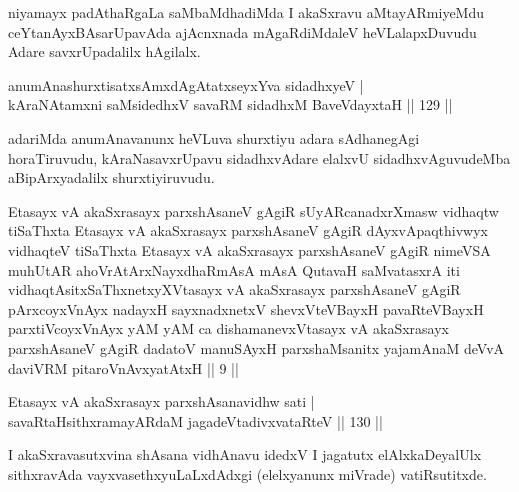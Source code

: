 \begin{artha}%
niyamayx padAthaRgaLa saMbaMdhadiMda I akaSxravu aMtayARmiyeMdu ceYtanAyxBAsarUpavAda ajAcnxnada mAgaRdiMdaleV heVLalapxDuvudu Adare savxrUpadalilx hAgilalx.
\end{artha}

\begin{shl}
anumAnashurxtisatxsAmxdAgAtatxseyxYva sidadhxyeV |\\
kAraNAtamxni saMsidedhxV savaRM sidadhxM BaveVdayxtaH \hfill || 129 ||
\end{shl}

\begin{artha}
adariMda anumAnavanunx heVLuva shurxtiyu adara sAdhanegAgi horaTiru\-vudu, kAraNasavxrUpavu sidadhxvAdare elalxvU sidadhxvAguvudeMba aBipArxyadalilx shurxtiyiruvudu.
\end{artha}



\begin{kandikeshl}
Etasayx vA akaSxrasayx parxshAsaneV gAgiR sUyARcanadxrXmasw vidhaqtw tiSaThxta Etasayx vA akaSxrasayx parxshAsaneV gAgiR dAyxvApaqthivwyx vidhaqteV tiSaThxta Etasayx vA akaSxrasayx parxshAsaneV gAgiR nimeVSA muhUtAR ahoVrAtArxNayxdhaRmAsA mAsA QutavaH saMvatasxrA iti vidhaqtAsitxSaThxnetxyXVtasayx vA akaSxrasayx parxshAsaneV gAgiR pArxcoyxV\s nAyx nadayxH sayxnadxnetxV shevxVteVBayxH pavaRteVBayxH parxtiVcoyxV\s nAyx yAM yAM ca dishamanevxVtasayx vA akaSxrasayx parxshAsaneV gAgiR dadatoV manuSAyxH parxshaMsanitx yajamAnaM deVvA daviVRM pitaroV\s nAvxyatAtxH || 9 ||
\end{kandikeshl}


\begin{shl}
Etasayx vA akaSxrasayx parxshAsanavidhw sati |\\
savaRtaHsithxramayARdaM jagadeVtadivxvataRteV \hfill || 130 ||
\end{shl}

\begin{artha}%
I akaSxravasutxvina shAsana vidhAnavu idedxV I jagatutx elAlxkaDeyalUlx sithxravAda vayxvasethxyuLaLxdAdxgi (elelxyanunx miVrade) vatiRsutitxde.
\end{artha}

